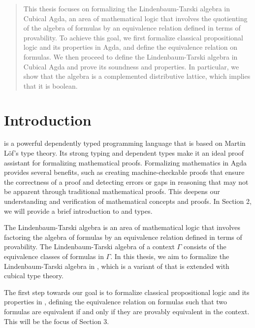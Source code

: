 \documentclass[titlepage]{article}
\begin{document}

\begin{abstract}
    This thesis focuses on formalizing the Lindenbaum-Tarski algebra in Cubical Agda, an area of mathematical logic that involves the quotienting of the algebra of formulas by an equivalence relation defined in terms of provability. To achieve this goal, we first formalize classical propositional logic and its properties in Agda, and define the equivalence relation on formulas. We then proceed to define the Lindenbaum-Tarski algebra in Cubical Agda and prove its soundness and properties. In particular, we show that the algebra is a complemented distributive lattice, which implies that it is boolean.
\end{abstract}

\tableofcontents
\thispagestyle{empty}
\newpage
\setcounter{page}{1}



\section{Introduction}

\Agda is a powerful dependently typed programming language that is based on Martin Löf's type theory. Its strong typing and dependent types make it an ideal proof assistant for formalizing mathematical proofs.\cite{AgdaDoc} Formalizing mathematics in Agda provides several benefits, such as creating machine-checkable proofs that ensure the correctness of a proof and detecting errors or gaps in reasoning that may not be apparent through traditional mathematical proofs. This deepens our understanding and verification of mathematical concepts and proofs. In Section 2, we will provide a brief introduction to \Agda and types.

The Lindenbaum-Tarski algebra is an area of mathematical logic that involves factoring the algebra of formulas by an equivalence relation defined in terms of provability.\cite{wikipedia} The Lindenbaum-Tarski algebra of a context $\Gamma$ consists of the equivalence classes of formulas in $\Gamma$. In this thesis, we aim to formalize the Lindenbaum-Tarski algebra in \CubicalAgda, which is a variant of \Agda that is extended with cubical type theory.

The first step towards our goal is to formalize classical propositional logic and its properties in \Agda, defining the equivalence relation on formulas such that two formulas are equivalent if and only if they are provably equivalent in the context. This will be the focus of Section 3.
\end{document}
